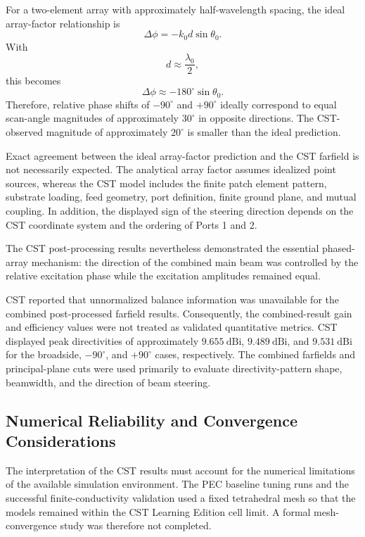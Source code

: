 For a two-element array with approximately half-wavelength spacing, the ideal array-factor relationship is
\[
\Delta\phi=-k_0d\sin\theta_0.
\]
With
\[
d\approx\frac{\lambda_0}{2},
\]
this becomes
\[
\Delta\phi\approx-180^\circ\sin\theta_0.
\]
Therefore, relative phase shifts of \(-90^\circ\) and \(+90^\circ\) ideally correspond to equal scan-angle
magnitudes of approximately \(30^\circ\) in opposite directions. The CST-observed magnitude of
approximately \(20^\circ\) is smaller than the ideal prediction.

Exact agreement between the ideal array-factor prediction and the CST farfield is not necessarily
expected. The analytical array factor assumes idealized point sources, whereas the CST model includes
the finite patch element pattern, substrate loading, feed geometry, port definition, finite ground
plane, and mutual coupling. In addition, the displayed sign of the steering direction depends on the
CST coordinate system and the ordering of Ports 1 and 2.

The CST post-processing results nevertheless demonstrated the essential phased-array mechanism:
the direction of the combined main beam was controlled by the relative excitation phase while the
excitation amplitudes remained equal.

CST reported that unnormalized balance information was unavailable for the combined post-processed
farfield results. Consequently, the combined-result gain and efficiency values were not treated as
validated quantitative metrics. CST displayed peak directivities of approximately
\(9.655~\mathrm{dBi}\), \(9.489~\mathrm{dBi}\), and \(9.531~\mathrm{dBi}\) for the broadside,
\(-90^\circ\), and \(+90^\circ\) cases, respectively. The combined farfields and principal-plane cuts
were used primarily to evaluate directivity-pattern shape, beamwidth, and the direction of beam
steering.

\subsection{Numerical Reliability and Convergence Considerations}
\label{subsec:numerical-reliability}

The interpretation of the CST results must account for the numerical limitations of the available
simulation environment. The PEC baseline tuning runs and the successful finite-conductivity validation
used a fixed tetrahedral mesh so that the models remained within the CST Learning Edition cell limit.
A formal mesh-convergence study was therefore not completed.

